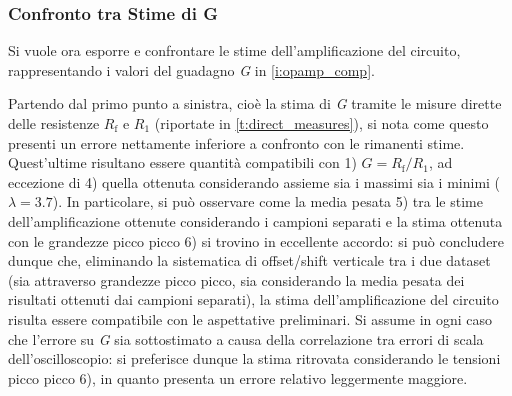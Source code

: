 \documentclass[a4paper,11pt]{article} %
\begin{document}

\subsubsection{Confronto tra Stime di G}
%
%
%

Si vuole ora esporre e confrontare le stime dell'amplificazione del circuito, rappresentando i valori del guadagno
\textit{G} in \autoref{i:opamp_comp}.



\noindent Partendo dal primo punto a sinistra, cioè la stima di \textit{G} tramite le misure dirette delle resistenze
$R_{\text{f}}$ e $R_{1}$ (riportate in \autoref{t:direct_measures}), si nota come questo presenti un errore nettamente
inferiore a confronto con le rimanenti stime. Quest'ultime risultano essere quantità compatibili con 1)
$G=R_{\text{f}}/R_{1}$, ad eccezione di 4) quella ottenuta considerando assieme sia i massimi sia i minimi ($\lambda =
3.7$). In particolare, si può osservare come la media pesata 5) tra le stime dell'amplificazione ottenute considerando i
campioni separati e la stima ottenuta con le grandezze picco picco 6) si trovino in eccellente accordo: si può concludere
dunque che, eliminando la sistematica di offset/shift verticale tra i due dataset (sia attraverso grandezze picco picco,
sia considerando la media pesata dei risultati ottenuti dai campioni separati), la stima dell'amplificazione del
circuito risulta essere compatibile con le aspettative preliminari. Si assume in ogni caso che l'errore su \textit{G}
sia sottostimato a causa della correlazione tra errori di scala dell'oscilloscopio: si preferisce dunque la stima
ritrovata considerando le tensioni picco picco 6), in quanto presenta un errore relativo leggermente maggiore.
\end{document}
